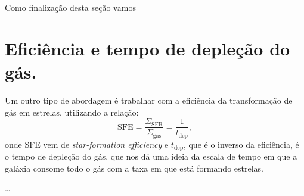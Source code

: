 Como finalização desta seção vamos 

\section{Eficiência e tempo de depleção do gás.}
\label{sec:gasfrac:SFE}

Um outro tipo de abordagem é trabalhar com a eficiência da transformação de gás em estrelas,
utilizando a relação:
\begin{equation}
	\mathrm{SFE} = \frac{\Sigma_{\mathrm{SFR}}}{\Sigma_{\mathrm{gas}}} = \frac{1}{t_{\mathrm{dep}}},
	\label{eq:SFE}
\end{equation}
\noindent onde SFE vem de {\em star-formation efficiency} e $t_{\mathrm{dep}}$, que é o inverso da
eficiência, é o tempo de depleção do gás, que nos dá uma ideia da escala de tempo em que a galáxia
consome todo o gás com a taxa em que está formando estrelas.

\ldots

